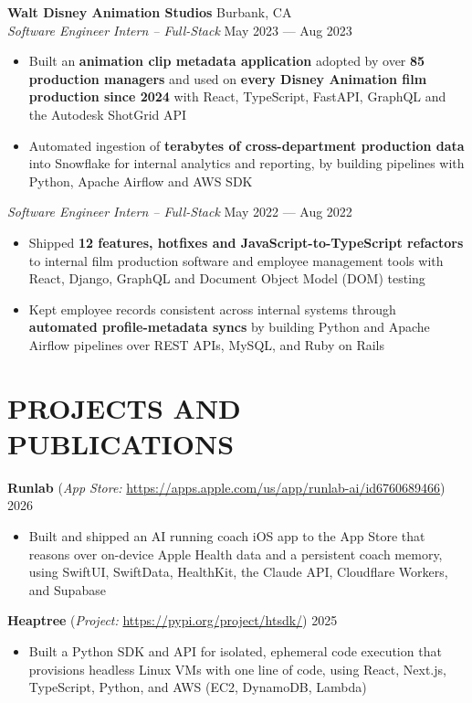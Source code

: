 \documentclass[letterpaper,10pt]{extarticle}
\begin{document}
\noindent
\textbf{Walt Disney Animation Studios} \hfill Burbank, CA \\
\textit{Software Engineer Intern -- Full-Stack} \hfill May 2023 --- Aug 2023
\begin{itemize}
    \item Built an \textbf{animation clip metadata application} adopted by over \textbf{85 production managers} and used on \textbf{every Disney Animation film production since 2024} with React, TypeScript, FastAPI, GraphQL and the Autodesk ShotGrid API
    \item Automated ingestion of \textbf{terabytes of cross-department production data} into Snowflake for internal analytics and reporting, by building pipelines with Python, Apache Airflow and AWS SDK
\end{itemize}

\noindent
\textit{Software Engineer Intern -- Full-Stack} \hfill May 2022 --- Aug 2022
\begin{itemize}
    \item Shipped \textbf{12 features, hotfixes and JavaScript-to-TypeScript refactors} to internal film production software and employee management tools with React, Django, GraphQL and Document Object Model (DOM) testing
    \item Kept employee records consistent across internal systems through \textbf{automated profile-metadata syncs} by building Python and Apache Airflow pipelines over REST APIs, MySQL, and Ruby on Rails
\end{itemize}

\section*{PROJECTS AND PUBLICATIONS}
\noindent
\textbf{Runlab}
(\textit{App Store:} \url{https://apps.apple.com/us/app/runlab-ai/id6760689466}) \hfill 2026
\begin{itemize}
    \item Built and shipped an AI running coach iOS app to the App Store that reasons over on-device Apple Health data and a persistent coach memory, using SwiftUI, SwiftData, HealthKit, the Claude API, Cloudflare Workers, and Supabase
\end{itemize}

\noindent
\textbf{Heaptree}
(\textit{Project:} \url{https://pypi.org/project/htsdk/}) \hfill 2025
\begin{itemize}
    \item Built a Python SDK and API for isolated, ephemeral code execution that provisions headless Linux VMs with one line of code, using React, Next.js, TypeScript, Python, and AWS (EC2, DynamoDB, Lambda)
\end{itemize}
\end{document}
